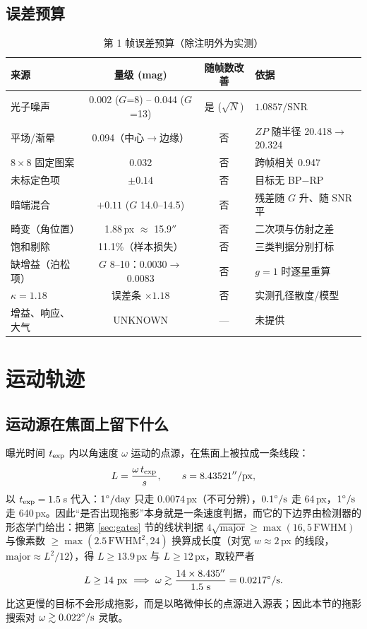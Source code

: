 \documentclass[11pt,a4paper]{ctexart}
\begin{document}
\subsection{误差预算}\label{sec:errbudget}
\begin{table}[htbp]\centering\small
\caption{第 1 帧误差预算（除注明外为实测）}\label{tab:budget}
\begin{tabular}{@{}lccl@{}}
\toprule
来源 & 量级 (mag) & 随帧数改善 & 依据\\
\midrule
光子噪声 & 0.002 ($G$=8) -- 0.044 ($G$=13) & 是 ($\sqrt N$) & $1.0857/\mathrm{SNR}$\\
平场/渐晕 & 0.094（中心$\to$边缘） & 否 & $ZP$ 随半径 20.418$\to$20.324\\
$8\times8$ 固定图案 & 0.032 & 否 & 跨帧相关 0.947\\
未标定色项 & $\pm0.14$ & 否 & 目标无 BP$-$RP\\
暗端混合 & $+0.11$ ($G$ 14.0--14.5) & 否 & 残差随 $G$ 升、随 SNR 平\\
畸变（角位置） & 1.88\,px $\approx$ 15.9$''$ & 否 & 二次项与仿射之差\\
饱和剔除 & 11.1\%（样本损失） & 否 & 三类判据分别打标\\
缺增益（泊松项） & $G$ 8--10：0.0030$\to$0.0083 & 否 & $g=1$ 时逐星重算\\
$\kappa=1.18$ & 误差条 $\times1.18$ & 否 & 实测孔径散度/模型\\
增益、响应、大气 & UNKNOWN & --- & 未提供\\
\bottomrule
\end{tabular}
\end{table}

\section{运动轨迹}\label{sec:motion}
\subsection{运动源在焦面上留下什么}
曝光时间 $t_{\rm exp}$ 内以角速度 $\omega$ 运动的点源，在焦面上被拉成一条线段：
\begin{equation}
L=\frac{\omega\,t_{\rm exp}}{s},\qquad s=8.43521''/{\rm px},
\label{eq:trail}
\end{equation}
以 $t_{\rm exp}=1.5$\,s 代入：$1^\circ/{\rm day}$ 只走 $0.0074$\,px（不可分辨），$0.1^\circ/{\rm s}$ 走 64\,px，$1^\circ/{\rm s}$ 走 640\,px。因此“是否出现拖影”本身就是一条速度判据，而它的下边界由检测器的形态学门给出：把第 \ref{sec:gates} 节的线状判据 $4\sqrt{\text{major}}\ge\max(16,5\,\mathrm{FWHM})$ 与像素数 $\ge\max(2.5\,\mathrm{FWHM}^2,24)$ 换算成长度（对宽 $w\approx2$\,px 的线段，$\text{major}\approx L^2/12$），得 $L\ge13.9$\,px 与 $L\ge12$\,px，取较严者
\begin{equation}
L\ge14\ {\rm px}\ \Longrightarrow\ \omega\gtrsim\frac{14\times8.435''}{1.5\ {\rm s}}=0.0217^\circ/{\rm s}.
\label{eq:omegamin}
\end{equation}
比这更慢的目标不会形成拖影，而是以略微伸长的点源进入源表；因此本节的拖影搜索对 $\omega\gtrsim0.022^\circ/{\rm s}$ 灵敏。
\end{document}
